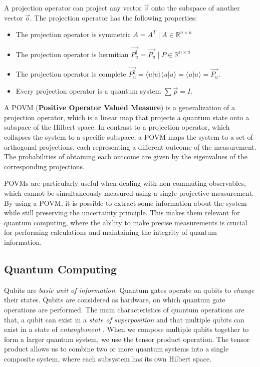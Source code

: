 \documentclass[11pt]{article}
\providecommand{\braket}[2]{\langle#1|#2\rangle}
\theoremstyle{definition}
\theoremstyle{definition}
\begin{document}
A projection operator can project any vector \(\vec{v}\) onto the subspace of
another vector \(\vec{o}\).
The projection operator has the following properties:
\begin{itemize}
\item The projection operator is symmetric \(A = A^T \mid A \in \mathbb{R}^{n \times n}\)
\item The projection operator is hermitian \(\vec{P_u^\dagger} = \vec{P_u} \mid P \in \mathbb{R}^{n \times n}\)
\item The projection operator is complete \(\vec{P_u^2} = \braket{u}{u}\braket{u}{u} = \braket{u}{u} = \vec{P_u}\).
\item Every projection operator is a quantum system \(\sum\vec{p} = I\).
\end{itemize}

A POVM (\textbf{Positive Operator Valued Measure}) is a generalization of a projection
operator, which is a linear map that projects a quantum state onto a
subspace of the Hilbert space. In contrast to a projection operator, which
collapses the system to a specific subspace, a POVM maps the system to a
set of orthogonal projections, each representing a different outcome of the
measurement. The probabilities of obtaining each outcome are given by the
eigenvalues of the corresponding projections.

POVMs are particularly useful when dealing with non-commuting observables,
which cannot be simultaneously measured using a single projective
measurement. By using a POVM, it is possible to extract some information
about the system while still preserving the uncertainty principle. This
makes them relevant for quantum computing, where the ability to make
precise measurements is crucial for performing calculations and maintaining
the integrity of quantum information.

\subsection{Quantum Computing}
\label{sec:orgf6a02ee}
Qubits are \emph{basic unit of information}.
Quantum gates operate on qubits to \emph{change} their states.
Qubits are considered as hardware, on which quantum gate operations are performed.
The main characteristics of quantum operations are that, a qubit can exist in
a \emph{state of superposition} and that multiple qubits can exist in a state of
\emph{entanglement} \cite{nielsen_quantum_2010}.
When we compose multiple qubits together to form a larger quantum system, we
use the tensor product operation. The tensor product allows us to combine
two or more quantum systems into a single composite system, where each
subsystem has its own Hilbert space.
\end{document}
